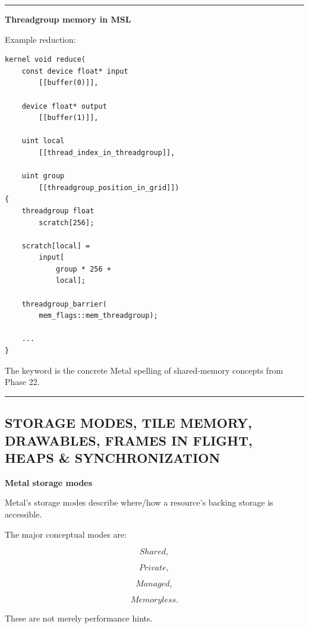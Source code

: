 \begin{center}\rule{0.5\linewidth}{0.5pt}\end{center}

\textbf{Threadgroup memory in MSL}

Example reduction:

\begin{verbatim}
kernel void reduce(
    const device float* input
        [[buffer(0)]],

    device float* output
        [[buffer(1)]],

    uint local
        [[thread_index_in_threadgroup]],

    uint group
        [[threadgroup_position_in_grid]])
{
    threadgroup float
        scratch[256];

    scratch[local] =
        input[
            group * 256 +
            local];

    threadgroup_barrier(
        mem_flags::mem_threadgroup);

    ...
}
\end{verbatim}

The keyword  is the concrete Metal spelling of shared-memory concepts from Phase 22.

\begin{center}\rule{0.5\linewidth}{0.5pt}\end{center}

\subsection{STORAGE MODES, TILE MEMORY, DRAWABLES, FRAMES IN FLIGHT, HEAPS \& SYNCHRONIZATION}\label{01-foundations-i-ch015-storage-modes-tile-memory-drawables-frames-in-flight-heaps-synchronization}

\hypertarget{01-foundations-i-ch015-storage-modes-tile-memory-drawables-frames-in-flight-heaps-synchronization}{}

\textbf{Metal storage modes}

Metal's storage modes describe where/how a resource's backing storage is accessible.

The major conceptual modes are:

\[
Shared,
\]

\[
Private,
\]

\[
Managed,
\]

\[
Memoryless.
\]

These are not merely performance hints.

